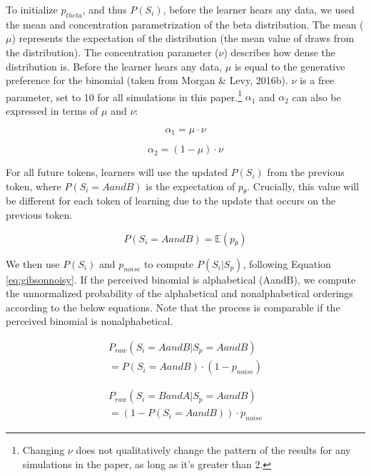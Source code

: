 \documentclass[10pt, letterpaper, hidelinks]{article}
\begin{document}
To initialize \(p_{theta}\), and thus \(P(S_i)\), before the learner
hears any data, we used the mean and concentration parametrization of
the beta distribution. The mean (\(\mu\)) represents the expectation of
the distribution (the mean value of draws from the distribution). The
concentration parameter (\(\nu\)) describes how dense the distribution
is. Before the learner hears any data, \(\mu\) is equal to the
generative preference for the binomial (taken from Morgan \& Levy,
2016b). \(\nu\) is a free parameter, set to 10 for all simulations in
this paper.\footnote{Changing \(\nu\) does not qualitatively change the
  pattern of the results for any simulations in the paper, as long as
  it's greater than 2.} \(\alpha_1\) and \(\alpha_2\) can also be
expressed in terms of \(\mu\) and \(\nu\):

\begin{equation}
\label{eq:alpha1}
\alpha_1 = \mu \cdot \nu
\end{equation}

\begin{equation}
\label{eq:alpha2}
\alpha_2 = (1-\mu) \cdot \nu
\end{equation}

For all future tokens, learners will use the updated \(P(S_i)\) from the
previous token, where \(P(S_i = AandB)\) is the expectation of
\(p_\theta\). Crucially, this value will be different for each token of
learning due to the update that occurs on the previous token.

\begin{equation}
\label{eq:expectationptheta}
P(S_i = AandB) = \mathbb{E}(p_\theta)
\end{equation}

We then use \(P(S_i)\) and \(p_{noise}\) to compute \(P(S_i|S_p)\),
following Equation \ref{eq:gibsonnoisy}. If the perceived binomial is
alphabetical (AandB), we compute the unnormalized probability of the
alphabetical and nonalphabetical orderings according to the below
equations. Note that the process is comparable if the perceived binomial
is nonalphabetical.

\begin{multline}
\label{eq:praw}
P_{raw}(S_i = AandB|S_p = AandB) \\ = P(S_i = AandB) \cdot (1 -  p_{noise})
\end{multline}

\begin{multline}
\label{eq:prawtwo}
P_{raw}(S_i = BandA|S_p = AandB) \\ = (1 - P(S_i = AandB)) \cdot p_{noise}
\end{multline}
\end{document}
